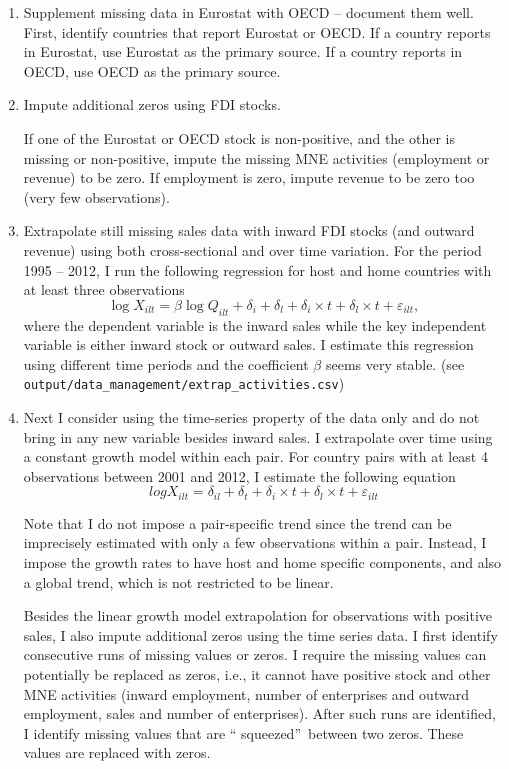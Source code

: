 \documentclass[notitlepage,11pt]{article}%
\begin{document}
\begin{enumerate}
\item Supplement missing data in Eurostat with OECD -- document them well.
First, identify countries that report Eurostat or OECD. If a country reports
in Eurostat, use Eurostat as the primary source. If a country reports in OECD,
use OECD as the primary source.

\item Impute additional zeros using FDI stocks.

If one of the Eurostat or OECD stock is non-positive, and the other is missing
or non-positive, impute the missing MNE activities (employment or revenue) to
be zero. If employment is zero, impute revenue to be zero too (very few observations).

\item Extrapolate still missing sales data with inward FDI stocks (and outward
revenue) using both cross-sectional and over time variation. For the period
1995 -- 2012, I run the following regression for host and home countries with
at least three observations%
\[
\log X_{ilt}=\beta\log Q_{ilt}+\delta_{i}+\delta_{l}+\delta_{i}\times
t+\delta_{l}\times t+\varepsilon_{ilt},
\]
where the dependent variable is the inward sales while the key independent
variable is either inward stock or outward sales. I estimate this regression
using different time periods and the coefficient $\beta$ seems very stable.
(see \texttt{output/data\_management/extrap\_activities.csv})

\item Next I consider using the time-series property of the data only and do
not bring in any new variable besides inward sales. I extrapolate over time
using a constant growth model within each pair. For country pairs with at
least 4 observations between 2001 and 2012, I estimate the following equation%
\[
logX_{ilt}=δ _{il}+δ _{t}+δ _{i}\times t+δ _{l}\times
t+ε _{ilt}%
\]


Note that I do not impose a pair-specific trend since the trend can be
imprecisely estimated with only a few observations within a pair. Instead, I
impose the growth rates to have host and home specific components, and also a
global trend, which is not restricted to be linear.

Besides the linear growth model extrapolation for observations with positive
sales, I also impute additional zeros using the time series data. I first
identify consecutive runs of missing values or zeros. I require the missing
values can potentially be replaced as zeros, i.e., it cannot have positive
stock and other MNE activities (inward employment, number of enterprises and
outward employment, sales and number of enterprises). \qquad After such runs
are identified, I identify missing values that are \textquotedblleft
squeezed\textquotedblright\ between two zeros. These values are replaced with zeros.
\end{enumerate}
\end{document}
